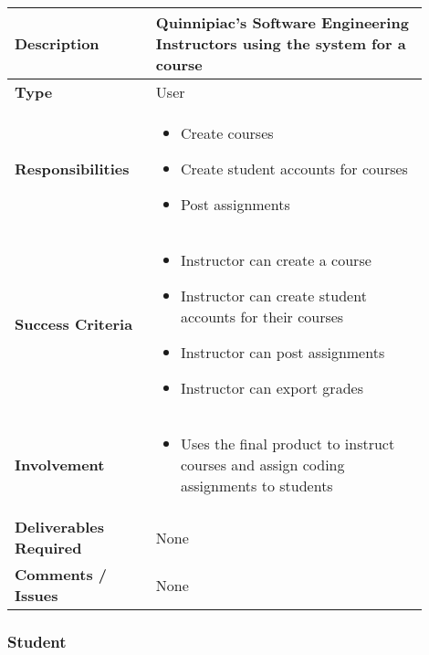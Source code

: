 \documentclass{article}
\begin{document}
\begin{tabular}{| p{0.3\linewidth} | p{0.6\linewidth} |}
  \hline
  \textbf{Description}& Quinnipiac's Software Engineering Instructors using the system for a course\\
  \hline
  \textbf{Type} & User\\
  \hline
  \textbf{Responsibilities} & \begin{itemize}
    \item Create courses
    \item Create student accounts for courses
    \item Post assignments
  \end{itemize} \\
  \hline
  \textbf{Success Criteria}& \begin{itemize}
    \item Instructor can create a course
    \item Instructor can create student accounts for their courses
    \item Instructor can post assignments
    \item Instructor can export grades
  \end{itemize}\\
  \hline
  \textbf{Involvement} & \begin{itemize}
    \item Uses the final product to instruct courses and assign coding assignments to students
  \end{itemize} \\
  \hline
  \textbf{Deliverables Required}& None \\
  \hline
  \textbf{Comments / Issues} & None \\
  \hline
\end{tabular}

\subsubsection{Student}
\end{document}
